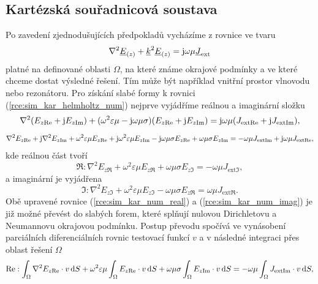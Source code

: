 \subsection{Kartézská souřadnicová soustava} \label{subsec:sim_kar}
Po zavedení zjednodušujících předpokladů vycházíme z rovnice ve tvaru
\begin{equation}
	\nabla^{2}{\underline{E}}_{(z)} +{\underline{k}}^{2}{\underline{E}}_{(z)} = \mathrm{j}\omega\mu{\underline{J}}_{\mathrm{ext}}
	\label{rce:sim_kar_helmholtz_num} 
\end{equation}
platné na definované oblasti $\Omega$, na které známe okrajové podmínky a ve které chceme dostat výsledné řešení. Tím může být například vnitřní prostor vlnovodu nebo rezonátoru. Pro získání slabé formy k rovnici (\ref{rce:sim_kar_helmholtz_num}) nejprve vyjádříme reálnou a imaginární složku
\begin{displaymath}
	\nabla^{2}(E_{z\mathrm{Re}} + \mathrm{j} E_{z\mathrm{Im}}) + (\omega^{2}\varepsilon\mu - \mathrm{j}\omega\mu\sigma)(E_{z\mathrm{Re}} + \mathrm{j} E_{z\mathrm{Im}}) = \mathrm{j}\omega\mu (J_{\mathrm{ext}\mathrm{Re}} + \mathrm{j} J_{\mathrm{ext}\mathrm{Im}}),
\end{displaymath}
\begin{displaymath}
	\nabla^{2} E_{z\mathrm{Re}} + \mathrm{j}\nabla^{2} E_{z\mathrm{Im}} + \omega^{2}\varepsilon\mu E_{z\mathrm{Re}} + \mathrm{j}\omega^{2}\varepsilon\mu E_{z\mathrm{Im}} - \mathrm{j}\omega\mu\sigma E_{z\mathrm{Re}} + \omega\mu\sigma E_{z\mathrm{Im}} = - \omega\mu J_{\mathrm{ext}\mathrm{Im}} + \mathrm{j}\omega\mu J_{\mathrm{ext}\mathrm{Re}},
\end{displaymath}
kde reálnou část tvoří
\begin{equation}
	\Re : \nabla^{2} E_{z\Re} + \omega^{2}\varepsilon\mu E_{z\Re} + \omega\mu\sigma E_{z\Im} = - \omega\mu J_{\mathrm{ext}\Im},
	\label{rce:sim_kar_num_real} 
\end{equation}
a imaginární je vyjádřena
\begin{equation}
	\Im : \nabla^{2} E_{z\Im} + \omega^{2}\varepsilon\mu E_{z\Im} - \omega\mu\sigma E_{z\Re} = \omega\mu J_{\mathrm{ext}\Re}.
	\label{rce:sim_kar_num_imag} 
\end{equation}
Obě upravené rovnice (\ref{rce:sim_kar_num_real}) a (\ref{rce:sim_kar_num_imag}) je již možné převést do slabých forem, které splňují nulovou Dirichletovu a Neumannovu okrajovou podmínku. Postup převodu spočívá ve vynásobení parciálních diferenciálních rovnic testovací funkcí $v$ a v následné integraci přes oblast řešení $\Omega$ 
\begin{equation}
	\mathrm{Re} : \int_{\Omega}\nabla^{2} E_{z\mathrm{Re}}\cdot v \,\mathrm{d} S + \omega^{2}\varepsilon\mu\int_{\Omega} E_{z\mathrm{Re}}\cdot v\,\mathrm{d} S + \omega\mu\sigma\int_{\Omega} E_{z\mathrm{Im}}\cdot v\,\mathrm{d} S = - \omega\mu \int_{\Omega}J_{\mathrm{ext}\mathrm{Im}}\cdot v \,\mathrm{d} S,
	\label{rce:sim_kar_weak_odv_real} 
\end{equation}
